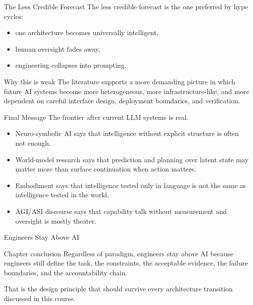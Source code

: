 \documentclass[12pt]{beamer}
\begin{document}
\begin{frame}{The Less Credible Forecast}
  The less credible forecast is the one preferred by hype cycles:
  \begin{itemize}
    \item one architecture becomes universally intelligent,
    \item human oversight fades away,
    \item engineering collapses into prompting.
  \end{itemize}

  \begin{warningbox}{Why this is weak}
    The literature supports a more demanding picture in which future AI systems become more heterogeneous, more infrastructure-like, and more dependent on careful interface design, deployment boundaries, and verification.
  \end{warningbox}
\end{frame}

\begin{frame}{Final Message}
  The frontier after current LLM systems is real.

  \begin{itemize}
    \item Neuro-symbolic AI says that intelligence without explicit structure is often not enough.
    \item World-model research says that prediction and planning over latent state may matter more than surface continuation when action matters.
    \item Embodiment says that intelligence tested only in language is not the same as intelligence tested in the world.
    \item AGI/ASI discourse says that capability talk without measurement and oversight is mostly theater.
  \end{itemize}
\end{frame}

\begin{frame}{Engineers Stay Above AI}
  \begin{conceptbox}{Chapter conclusion}
    Regardless of paradigm, engineers stay above AI because engineers still define the task, the constraints, the acceptable evidence, the failure boundaries, and the accountability chain.
  \end{conceptbox}

  That is the design principle that should survive every architecture transition discussed in this course.
\end{frame}
\end{document}
